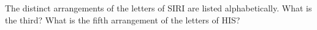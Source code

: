 The distinct arrangements of the letters of SIRI are listed alphabetically. What is the third? What is the fifth arrangement of the letters of HIS?

